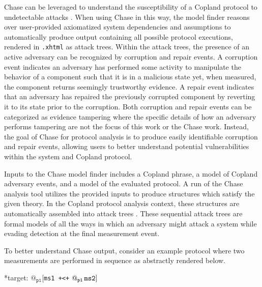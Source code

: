 \documentclass[runningheads]{llncs}
\theoremstyle{definition}
\begin{document}
Chase can be leveraged to understand the susceptibility of a Copland protocol to undetectable attacks \cite{Rowe:2021:AutomatedTrust}. When using Chase in this way, the model finder reasons over user-provided axiomatized system dependencies and assumptions to automatically produce output containing all possible protocol executions, rendered in \texttt{.xhtml} as attack trees. Within the attack trees, the presence of an active adversary can be recognized by corruption and repair events. A corruption event indicates an adversary has performed some activity to manipulate the behavior of a component such that it is in a malicious state yet, when measured, the component returns seemingly trustworthy evidence. A repair event indicates that an adversary has repaired the previously corrupted component by reverting it to its state prior to the corruption. Both corruption and repair events can be categorized as evidence tampering where the specific details of how an adversary performs tampering are not the focus of this work or the Chase work. Instead, the goal of Chase for protocol analysis is to produce easily identifiable corruption and repair events, allowing users to better understand potential vulnerabilities within the system and Copland protocol. 

Inputs to the Chase model finder includes a Copland phrase, a model of Copland adversary events, and a model of the evaluated protocol. A run of the Chase analysis tool utilizes the provided inputs to produce structures which satisfy the given theory. In the Copland protocol analysis context, these structures are automatically assembled into attack trees \cite{Rowe:2021:AutomatedTrust}. These sequential attack trees \cite{Horne:Attack, Jhaware:attack} are formal models of all the ways in which an adversary might attack a system while evading detection at the final measurement event. 

To better understand Chase output, consider an example protocol where two measurements are performed in sequence as abstractly rendered below.

\begin{center}
    *target: $@_{\texttt{p1}}$[\texttt{ms1 +<+} $\mathop{@_{\texttt{p1}}}{\texttt{ms2}}]$
\end{center}
\end{document}
